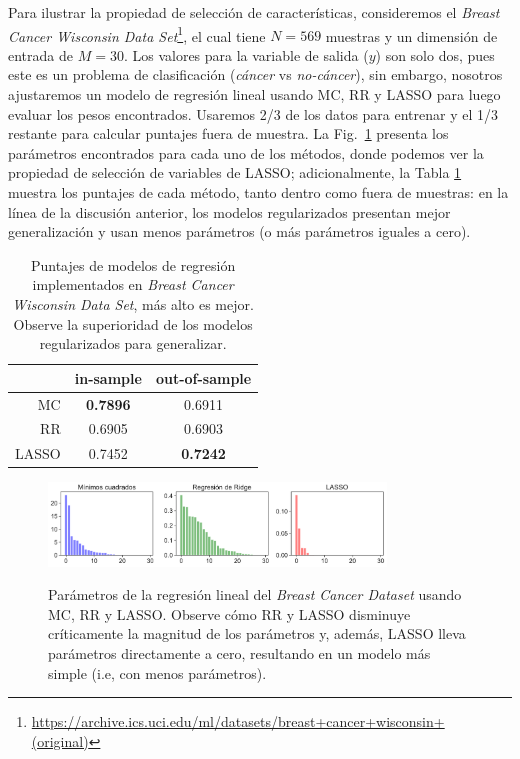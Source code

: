 Para ilustrar la propiedad de selección de características, consideremos el \emph{Breast Cancer Wisconsin Data Set}\footnote{\url{https://archive.ics.uci.edu/ml/datasets/breast+cancer+wisconsin+(original)}}, el cual tiene $N=569$ muestras y un dimensión de entrada de $M=30$. Los valores para la variable de salida ($y$) son solo dos, pues este es un problema de clasificación (\emph{cáncer} vs \emph{no-cáncer}), sin embargo, nosotros ajustaremos un modelo de regresión lineal usando MC, RR y LASSO para luego evaluar los pesos encontrados. Usaremos 2/3 de los datos para entrenar y el 1/3 restante para calcular puntajes fuera de muestra. La Fig.~\ref{fig:MC_RR_LASSO_breastcancer} presenta los parámetros encontrados para cada uno de los métodos, donde podemos ver la propiedad de selección de variables de LASSO; adicionalmente, la Tabla \ref{tab:breastMC_RR_LASSO} muestra los puntajes de cada método, tanto dentro como fuera de muestras: en la línea de la discusión anterior, los modelos regularizados presentan mejor generalización y usan menos parámetros (o más parámetros iguales a cero). 


\begin{table}
\centering
\caption{Puntajes de modelos de regresión implementados en \emph{Breast Cancer Wisconsin Data Set}, más alto es mejor. Observe la superioridad de los modelos regularizados para generalizar.}
	\label{tab:breastMC_RR_LASSO}
	\begin{tabular}{ r|c|c } 
		 & in-sample & out-of-sample \\
		\hline
		MC & \textbf{0.7896} & 0.6911 \\ 
		RR & 0.6905 & 0.6903 \\ 
		LASSO & 0.7452 & \textbf{0.7242}
	\end{tabular}
\end{table}



 



\begin{figure}[H]
	\centering
	\includegraphics[width=0.8\textwidth]{img/cap1_OLS_RR_LASSO.pdf}\\
	\caption{Parámetros de la regresión lineal del \emph{Breast Cancer Dataset} usando MC, RR y LASSO. Observe cómo RR y LASSO disminuye críticamente la magnitud de los parámetros y, además, LASSO lleva parámetros directamente a cero, resultando en un modelo más simple (i.e, con menos parámetros).}
	\label{fig:MC_RR_LASSO_breastcancer}  
\end{figure}



